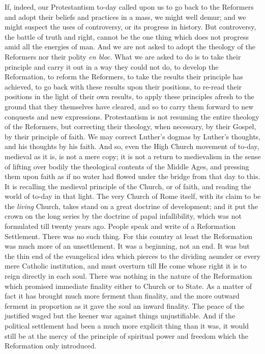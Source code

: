 \documentclass[12pt,a5paper,twoside]{book}
\begin{document}
If, indeed, our Protestantism to-day called upon us 
to go back to the Reformers and adopt their beliefs 
and practices in a mass, we might well demur; and 
we might suspect the uses of controversy, or its progress 
in history. But controversy, the battle of truth 
and right, cannot be the one thing which does not 
progress amid all the energies of man. And we are 
not asked to adopt the theology of the Reformers nor 
their polity \textit{en bloc}. What we are asked to do is to 
take their principle and carry it out in a way they 
could not do, to develop the Reformation, to reform 
the Reformers, to take the results their principle has 
achieved, to go back with these results upon their 
positions, to re-read their positions in the light of 
their own results, to apply these principles afresh to 
the ground that they themselves have cleared, and 
so to carry them forward to new conquests and new 
expressions. Protestantism is not resuming the entire 
theology of the Reformers, but correcting their theology, 
when necessary, by their Gospel, by their 
principle of faith. We may correct Luther's dogmas 
by Luther's thoughts, and his thoughts by his faith. 
And so, even the High Church movement of to-day, 
medieval as it is, is not a mere copy; it is not a return 
to medievalism in the sense of lifting over bodily the 
theological contents of the Middle Ages, and pressing 
them upon faith as if no water had flowed under 
the bridge from that day to this. It is recalling the 
medieval principle of the Church, or of faith, and 
reading the world of to-day in that light. The very 
Church of Rome itself, with its claim to be the \textit{living} 
Church, takes stand on a great doctrine of development; 
and it put the crown on the long series by 
the doctrine of papal infallibility, which was not 
formulated till twenty years ago. People speak and 
write of a Reformation Settlement. There was no 
such thing. For this country at least the Reformation 
was much more of an unsettlement. It was a 
beginning, not an end. It was but the thin end of 
the evangelical idea which pierces to the dividing 
asunder or every mere Catholic institution, and must 
overturn till He come whose right it is to reign 
directly in each soul. There was nothing in the 
nature of the Reformation which promised immediate 
finality either to Church or to State. As a matter 
of fact it has brought much more ferment than 
finality, and the more outward ferment in proportion 
as it gave the soul an inward finality. The 
peace of the justified waged but the keener war 
against things unjustifiable. And if the political settlement 
had been a much more explicit thing than it 
was, it would still be at the mercy of the principle 
of spiritual power and freedom which the Reformation 
only introduced. 
\end{document}
